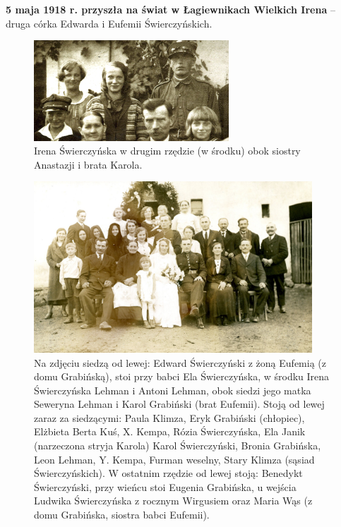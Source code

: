 \textbf{5 maja 1918 r. przyszła na świat w Łagiewnikach Wielkich Irena} -- druga córka Edwarda i Eufemii Świerczyńskich.

\begin{figure}[!h]
\begin{center}
\includegraphics[width=0.65\textwidth]{photo/irena_swierczynska_1.jpg}
\caption[Irena Świerczyńska obok siostry Anastazji i brata Karola]{Irena Świerczyńska w drugim rzędzie (w środku) obok siostry Anastazji i brata Karola.}
\label{rys:irena_swierczynska_1}
\end{center}
\end{figure}

\begin{figure}[!h]
\begin{center}
\includegraphics[width=0.93\textwidth]{photo/irena_antoni_lehman_slub.jpg}
\caption[Ślub Ireny i Antoniego Lehmanów]{Na zdjęciu siedzą od lewej: Edward Świerczyński z żoną Eufemią (z domu Grabińską), stoi przy babci Ela Świerczyńska, w środku Irena Świerczyńska Lehman i Antoni Lehman, obok siedzi jego matka Seweryna Lehman i Karol Grabiński (brat Eufemii). Stoją od lewej zaraz za siedzącymi: Paula Klimza, Eryk Grabiński (chłopiec), Elżbieta Berta Kuś, X. Kempa, Rózia Świerczyńska, Ela Janik (narzeczona stryja Karola) Karol Świerczyński, Bronia Grabińska, Leon Lehman, Y. Kempa, Furman weselny, Stary Klimza (sąsiad Świerczyńskich). W ostatnim rzędzie od lewej stoją: Benedykt Świerczyński, przy wieńcu stoi Eugenia Grabińska, u wejścia Ludwika Świerczyńska z rocznym Wirgusiem oraz Maria Wąs (z domu Grabińska, siostra babci Eufemii).}
\label{rys:irena_antoni_lehman_slub}
\end{center}
\end{figure}

